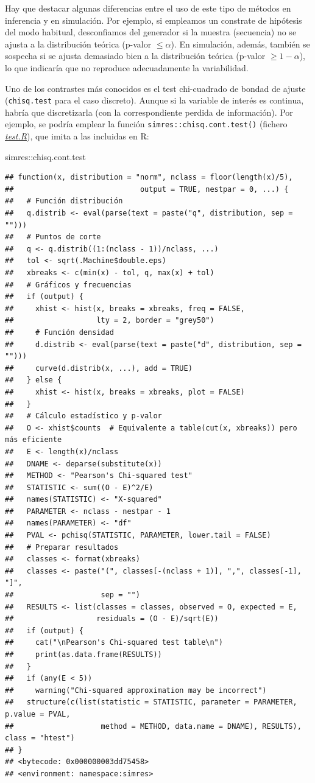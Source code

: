 \documentclass[
]{book}
\newenvironment{Shaded}{\begin{snugshade}}{\end{snugshade}}
\newcommand{\NormalTok}[1]{#1}
\newcommand{\SpecialCharTok}[1]{\textcolor[rgb]{0.00,0.00,0.00}{#1}}
\theoremstyle{break}
\theoremstyle{nonumberplain}
\begin{document}
Hay que destacar algunas diferencias entre el uso de este tipo de métodos en inferencia y en simulación.
Por ejemplo, si empleamos un constrate de hipótesis del modo habitual, desconfiamos del generador si la muestra (secuencia) no se ajusta a la distribución teórica (p-valor \(\leq \alpha\)).
En simulación, además, también se sospecha si se ajusta demasiado bien a la distribución teórica (p-valor \(\geq1-\alpha\)), lo que indicaría que no reproduce adecuadamente la variabilidad.

Uno de los contrastes más conocidos es el test chi-cuadrado de bondad de ajuste (\texttt{chisq.test} para el caso discreto).
Aunque si la variable de interés es continua, habría que discretizarla (con la correspondiente perdida de información).
Por ejemplo, se podría emplear la función \texttt{simres::chisq.cont.test()} (fichero \href{R/test.R}{\emph{test.R}}), que imita a las incluidas en R:

\begin{Shaded}
\begin{Highlighting}[]
\NormalTok{simres}\SpecialCharTok{::}\NormalTok{chisq.cont.test}
\end{Highlighting}
\end{Shaded}

\begin{verbatim}
## function(x, distribution = "norm", nclass = floor(length(x)/5),
##                             output = TRUE, nestpar = 0, ...) {
##   # Función distribución
##   q.distrib <- eval(parse(text = paste("q", distribution, sep = "")))
##   # Puntos de corte
##   q <- q.distrib((1:(nclass - 1))/nclass, ...)
##   tol <- sqrt(.Machine$double.eps)
##   xbreaks <- c(min(x) - tol, q, max(x) + tol)
##   # Gráficos y frecuencias
##   if (output) {
##     xhist <- hist(x, breaks = xbreaks, freq = FALSE,
##                   lty = 2, border = "grey50")
##     # Función densidad
##     d.distrib <- eval(parse(text = paste("d", distribution, sep = "")))
##     curve(d.distrib(x, ...), add = TRUE)
##   } else {
##     xhist <- hist(x, breaks = xbreaks, plot = FALSE)
##   }
##   # Cálculo estadístico y p-valor
##   O <- xhist$counts  # Equivalente a table(cut(x, xbreaks)) pero más eficiente
##   E <- length(x)/nclass
##   DNAME <- deparse(substitute(x))
##   METHOD <- "Pearson's Chi-squared test"
##   STATISTIC <- sum((O - E)^2/E)
##   names(STATISTIC) <- "X-squared"
##   PARAMETER <- nclass - nestpar - 1
##   names(PARAMETER) <- "df"
##   PVAL <- pchisq(STATISTIC, PARAMETER, lower.tail = FALSE)
##   # Preparar resultados
##   classes <- format(xbreaks)
##   classes <- paste("(", classes[-(nclass + 1)], ",", classes[-1], "]",
##                    sep = "")
##   RESULTS <- list(classes = classes, observed = O, expected = E,
##                   residuals = (O - E)/sqrt(E))
##   if (output) {
##     cat("\nPearson's Chi-squared test table\n")
##     print(as.data.frame(RESULTS))
##   }
##   if (any(E < 5))
##     warning("Chi-squared approximation may be incorrect")
##   structure(c(list(statistic = STATISTIC, parameter = PARAMETER, p.value = PVAL,
##                    method = METHOD, data.name = DNAME), RESULTS), class = "htest")
## }
## <bytecode: 0x000000003dd75458>
## <environment: namespace:simres>
\end{verbatim}
\end{document}
